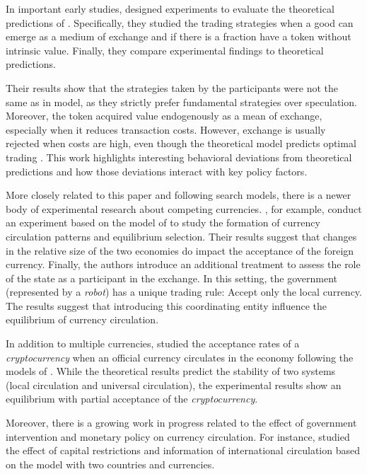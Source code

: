 In important early studies, \cite{10.2307/117162,RePEc:ier:iecrev:v:43:y:2002:i:3:p:637-674} designed  experiments to evaluate the theoretical predictions of \cite{10.2307/1832197,RePEc:aea:aecrev:v:83:y:1993:i:1:p:63-77}. Specifically, they studied the trading strategies when a good can emerge as a medium of exchange and if there is a fraction have a token without intrinsic value. Finally, they compare experimental findings to theoretical predictions.

Their results show that the strategies taken by the participants were not the same as in \cite{10.2307/117162} model, as they strictly prefer fundamental strategies over speculation. Moreover, the token acquired value endogenously as a mean of exchange, especially when it reduces transaction costs. However, exchange is usually rejected when costs are high, even though the theoretical model predicts optimal trading \citep{RePEc:ier:iecrev:v:43:y:2002:i:3:p:637-674}.  This work highlights interesting behavioral deviations from theoretical predictions and how those deviations interact with key policy factors.

More closely related to this paper and following search models, there is a newer body of experimental research about competing currencies. \cite{JiangZhang}, for example, conduct an experiment based on the model of \cite{MKM} to study the formation of currency circulation patterns and equilibrium selection. Their results suggest that changes in the relative size of the two economies do impact the acceptance of the foreign currency. Finally, the authors introduce an additional treatment to assess the role of the state as a participant in the exchange. In this setting, the government (represented by a  \textit{robot}) has a unique trading rule: Accept only the local currency. The results suggest that introducing this coordinating entity influence the equilibrium of currency circulation. 

In addition to multiple currencies, \cite{rietz2017} studied the acceptance rates of a \textit{cryptocurrency} when an official currency circulates in the economy following the models of  \cite{RePEc:aea:aecrev:v:83:y:1993:i:1:p:63-77, RePEc:eee:moneco:v:45:y:2000:i:1:p:155-184}. 
While the theoretical results predict the stability of two systems (local circulation and universal circulation), the experimental results show an equilibrium with partial acceptance of the \textit{cryptocurrency}. 


Moreover, there is a growing work in progress related to the effect of government intervention and monetary policy on currency circulation. For instance, \cite{dingpuzzello2019} studied the effect of capital restrictions and information of international circulation based on the \cite{RePEc:ucp:jpolec:v:113:y:2005:i:3:p:463-484} model with two countries and currencies.

